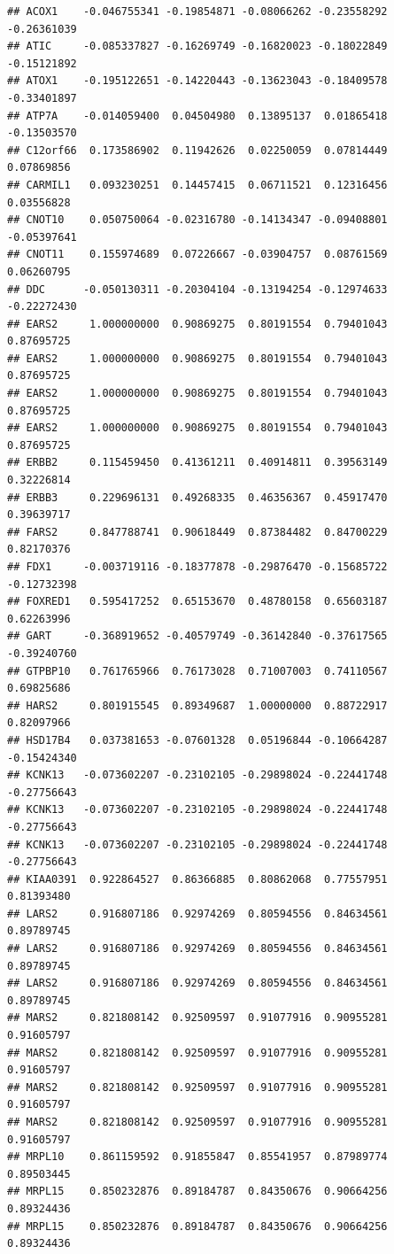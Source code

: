 \documentclass[
]{article}
\begin{document}
\begin{verbatim}
## ACOX1    -0.046755341 -0.19854871 -0.08066262 -0.23558292 -0.26361039
## ATIC     -0.085337827 -0.16269749 -0.16820023 -0.18022849 -0.15121892
## ATOX1    -0.195122651 -0.14220443 -0.13623043 -0.18409578 -0.33401897
## ATP7A    -0.014059400  0.04504980  0.13895137  0.01865418 -0.13503570
## C12orf66  0.173586902  0.11942626  0.02250059  0.07814449  0.07869856
## CARMIL1   0.093230251  0.14457415  0.06711521  0.12316456  0.03556828
## CNOT10    0.050750064 -0.02316780 -0.14134347 -0.09408801 -0.05397641
## CNOT11    0.155974689  0.07226667 -0.03904757  0.08761569  0.06260795
## DDC      -0.050130311 -0.20304104 -0.13194254 -0.12974633 -0.22272430
## EARS2     1.000000000  0.90869275  0.80191554  0.79401043  0.87695725
## EARS2     1.000000000  0.90869275  0.80191554  0.79401043  0.87695725
## EARS2     1.000000000  0.90869275  0.80191554  0.79401043  0.87695725
## EARS2     1.000000000  0.90869275  0.80191554  0.79401043  0.87695725
## ERBB2     0.115459450  0.41361211  0.40914811  0.39563149  0.32226814
## ERBB3     0.229696131  0.49268335  0.46356367  0.45917470  0.39639717
## FARS2     0.847788741  0.90618449  0.87384482  0.84700229  0.82170376
## FDX1     -0.003719116 -0.18377878 -0.29876470 -0.15685722 -0.12732398
## FOXRED1   0.595417252  0.65153670  0.48780158  0.65603187  0.62263996
## GART     -0.368919652 -0.40579749 -0.36142840 -0.37617565 -0.39240760
## GTPBP10   0.761765966  0.76173028  0.71007003  0.74110567  0.69825686
## HARS2     0.801915545  0.89349687  1.00000000  0.88722917  0.82097966
## HSD17B4   0.037381653 -0.07601328  0.05196844 -0.10664287 -0.15424340
## KCNK13   -0.073602207 -0.23102105 -0.29898024 -0.22441748 -0.27756643
## KCNK13   -0.073602207 -0.23102105 -0.29898024 -0.22441748 -0.27756643
## KCNK13   -0.073602207 -0.23102105 -0.29898024 -0.22441748 -0.27756643
## KIAA0391  0.922864527  0.86366885  0.80862068  0.77557951  0.81393480
## LARS2     0.916807186  0.92974269  0.80594556  0.84634561  0.89789745
## LARS2     0.916807186  0.92974269  0.80594556  0.84634561  0.89789745
## LARS2     0.916807186  0.92974269  0.80594556  0.84634561  0.89789745
## MARS2     0.821808142  0.92509597  0.91077916  0.90955281  0.91605797
## MARS2     0.821808142  0.92509597  0.91077916  0.90955281  0.91605797
## MARS2     0.821808142  0.92509597  0.91077916  0.90955281  0.91605797
## MARS2     0.821808142  0.92509597  0.91077916  0.90955281  0.91605797
## MRPL10    0.861159592  0.91855847  0.85541957  0.87989774  0.89503445
## MRPL15    0.850232876  0.89184787  0.84350676  0.90664256  0.89324436
## MRPL15    0.850232876  0.89184787  0.84350676  0.90664256  0.89324436

\end{verbatim}
\end{document}
